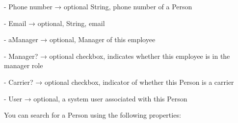 - Phone number → optional String, phone number of a Person

- Email →  optional, String, email

- aManager →  optional, Manager of this employee

- Manager? →  optional checkbox, indicates whether this employee is in the manager role

- Carrier? → optional checkbox, indicator of whether this Person is a carrier

- User → optional, a system user associated with this Person

You can search for a Person using the following properties: 


